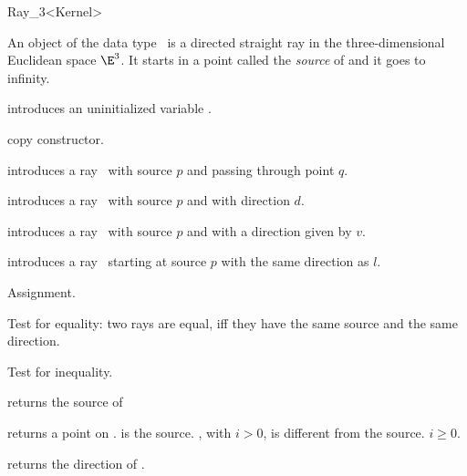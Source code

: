 \begin{ccRefClass} {Ray_3<Kernel>}

\ccDefinition
An object  of the data type \ccRefName\ is a directed
straight ray in the three-dimensional Euclidean space $\E^3$. It starts
in a  point called the {\em source} of   and it goes to infinity.


\ccCreation
{}


\ccHidden {}
             {introduces an uninitialized variable \ccVar.}

\ccHidden {}
 	    {copy constructor.}

            {introduces a ray \ccVar\ 
             with source $p$ and passing through point $q$.}

            {introduces a ray \ccVar\ with source $p$ and with 
             direction $d$.}

            {introduces a ray \ccVar\ with source $p$ and with 
             a direction given by $v$.}

            {introduces a ray \ccVar\ starting at source $p$ with 
             the same direction as $l$.}

\ccOperations

\ccHidden {}
        {Assignment.}

       {Test for equality: two rays are equal, iff they have the same 
        source and the same direction.}

       {Test for inequality.}



       {returns the source of \ccVar}

       {returns a point on \ccVar.  is the source.
        \ccStyle{point(i)}, with $i>0$, is different from the 
        source. \ccPrecond $i \geq 0$.}

       {returns the direction of \ccVar.}


\end{ccRefClass}
